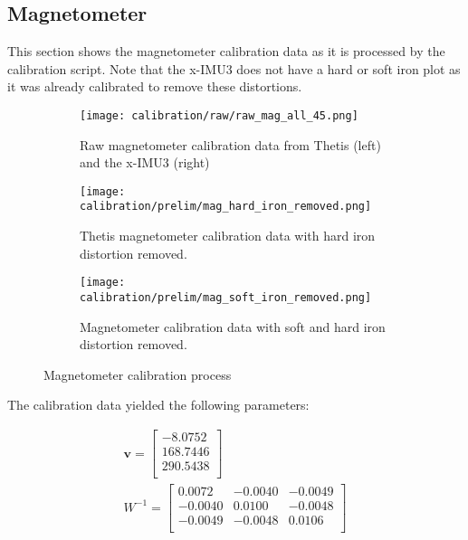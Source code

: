 \subsection{Magnetometer}
This section shows the magnetometer calibration data as it is processed by the calibration script.
Note that the x-IMU3 does not have a hard or soft iron plot as it was already calibrated to remove these distortions.

\begin{figure}
    \centering
    \begin{subfigure}[b]{0.6\textwidth}
        \centering
        \texttt{[image: calibration/raw/raw\_mag\_all\_45.png]}
        \caption[Raw Magnetometer Readings]{Raw magnetometer calibration data from Thetis (left) and the x-IMU3 (right)}
        \label{fig:mag_cal_raw}
    \end{subfigure}
    \hfill
    \begin{subfigure}[b]{0.3\textwidth}
        \centering
        \texttt{[image: calibration/prelim/mag\_hard\_iron\_removed.png]}
        \caption[Hard Iron Distortion Removed]{Thetis magnetometer calibration data with hard iron distortion removed.}
        \label{fig:mag_cal_hid_removed}
    \end{subfigure}
    \hfill
    \begin{subfigure}[b]{0.5\textwidth}
        \centering
        \texttt{[image: calibration/prelim/mag\_soft\_iron\_removed.png]}
        \caption[Soft Iron Distortion Removed]{Magnetometer calibration data with soft and hard iron distortion removed.}
        \label{fig:mag_cal_sid_removed}
    \end{subfigure}
       \caption{Magnetometer calibration process}
       \label{fig:magnetometer_calibration_process}
\end{figure}

The calibration data yielded the following parameters:

\begin{gather}
    \pmb{v} = \begin{bmatrix}
        -8.0752 \\
        168.7446 \\
        290.5438 \\
    \end{bmatrix} \\
    W^{-1} = \begin{bmatrix}
        0.0072 & -0.0040 & -0.0049 \\
        -0.0040 & 0.0100 & -0.0048 \\
        -0.0049 & -0.0048 & 0.0106 \\
    \end{bmatrix}
\end{gather}

